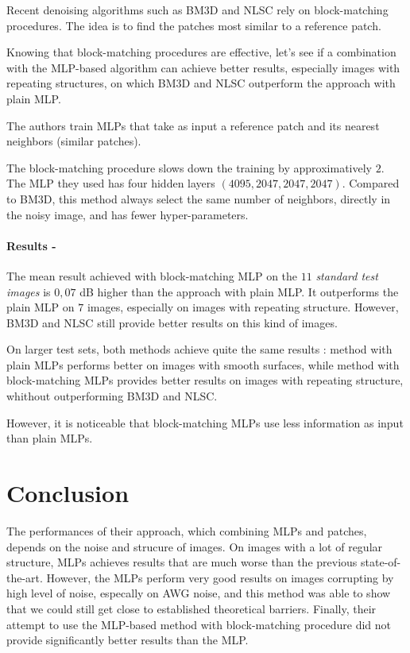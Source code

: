 \documentclass[10pt,a4paper]{article}
\newcommand{\ourparagraph}[1]{\paragraph{#1}}
\begin{document}
{Recent denoising algorithms such as BM3D and NLSC rely on block-matching procedures. The idea is to find the patches most similar to a reference patch.

Knowing that block-matching procedures are effective, let's see if a combination with the MLP-based algorithm can achieve better results, especially images with repeating structures, on which BM3D and NLSC outperform the approach with plain MLP.

The authors train MLPs that take as input a reference patch and its nearest neighbors (similar patches).

The block-matching procedure slows down the training by approximatively $2$. The MLP they used has four hidden layers $(4095, 2047, 2047, 2047)$. Compared to BM3D, this method always select the same number of neighbors, directly in the noisy image, and has fewer hyper-parameters.

\ourparagraph{Results -}{
The mean result achieved with block-matching MLP on the $11$ \textit{standard test images} is $0,07$ dB higher than the approach with plain MLP. It outperforms the plain MLP on $7$ images, especially on images with repeating structure. However, BM3D and NLSC still provide better results on this kind of images.

On larger test sets, both methods achieve quite the same results : method with plain MLPs performs better on images with smooth surfaces, while method with block-matching MLPs provides better results on images with repeating structure, whithout outperforming BM3D and NLSC.

However, it is noticeable that block-matching MLPs use less information as input than plain MLPs.}

\section{Conclusion}

The performances of their approach, which combining MLPs and patches, depends on the noise and strucure of images. On images with a lot of regular structure, MLPs achieves results that are much worse than the previous state-of-the-art. However, the MLPs perform very good results on images corrupting by high level of noise, especally on AWG noise, and this method was able to show that we could still get close to established theoretical barriers.
Finally, their attempt to use the MLP-based method with block-matching procedure did not provide significantly better results than the MLP.

}
\end{document}
